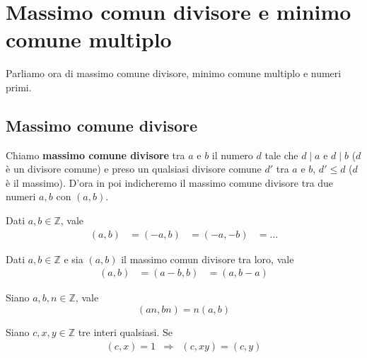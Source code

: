 \section{Massimo comun divisore e minimo comune multiplo}
Parliamo ora di massimo comune divisore, minimo comune multiplo e numeri primi.

\subsection{Massimo comune divisore}

\begin{defn}
	Chiamo \textbf{massimo comune divisore} tra $a$ e $b$ il numero $d$ tale che $d \mid a$ e
	$d \mid b$ ($d$ \`e un divisore comune) e preso un qualsiasi divisore comune $d'$ tra $a$
	e $b$, $d' \leq d$ ($d$ \`e il massimo). D'ora in poi indicheremo il massimo comune divisore
	tra due numeri $a, b$ con $(a, b)$.
\end{defn}

\begin{theorem}
	Dati $a, b \in \mathbb{Z}$, vale
	\begin{equation*}
		\begin{array}{llll}
			(a, b) & = (-a , b) & = (-a, -b) & = \dots
		\end{array}
	\end{equation*}
\end{theorem}

\begin{theorem}
	Dati $a, b \in \mathbb{Z}$ e sia $(a, b)$ il massimo comun divisore tra loro, vale
	\begin{equation*}
		\begin{array}{lll}
			(a, b) & = (a - b, b) & = (a, b - a)
		\end{array}
	\end{equation*}
\end{theorem}

\begin{proposition}
	Siano $a, b, n \in \mathbb{Z}$, vale
	\begin{equation*}
		(an, bn) = n(a, b)
	\end{equation*}
\end{proposition}

\begin{theorem}
	Siano $c, x, y \in \mathbb{Z}$ tre interi qualsiasi. Se
	\begin{equation*}
		\begin{array}{rcl}
			(c, x) = 1 & \Rightarrow & (c, xy) = (c, y)
		\end{array}
	\end{equation*}
\end{theorem}


